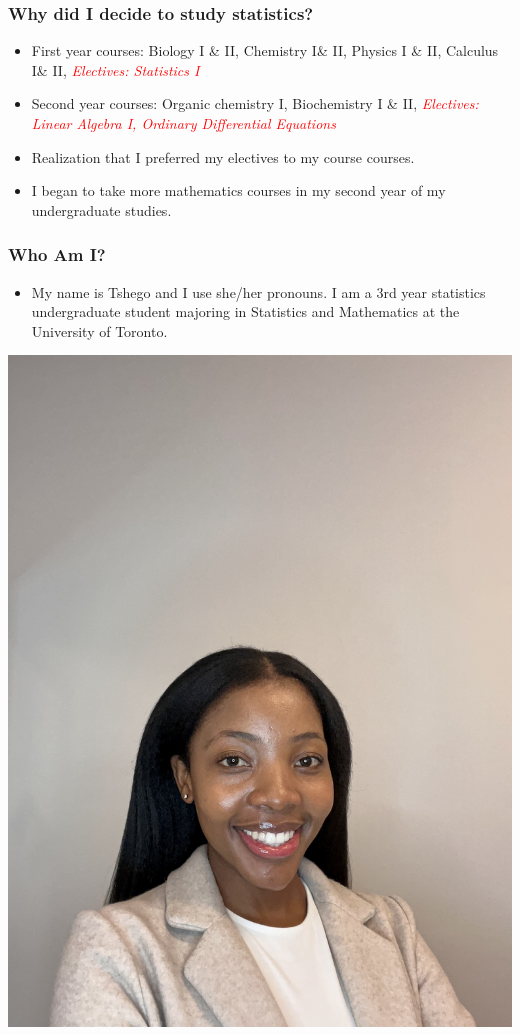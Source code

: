 \documentclass{beamer}
\begin{document}


\begin{frame}
\frametitle{\textbf{Why} did I decide to study statistics?}
\begin{itemize}
\item First year courses: Biology I \& II, Chemistry I\& II, Physics I \& II, Calculus I\& II, \textit{\textcolor{red}{Electives: Statistics I}}
\item Second year courses: Organic chemistry I, Biochemistry I \& II, \textit{\textcolor{red}{ Electives: Linear Algebra I, Ordinary Differential Equations}}
\item Realization that I preferred my electives to my course courses.  
\item I began to take more mathematics courses in my second year of my undergraduate studies. 
\end{itemize}

\end{frame}




\begin{frame}
\frametitle{\textbf{Who} Am I?}
\begin{itemize}
	\item My name is Tshego and I use she/her pronouns. I am a 3rd year statistics undergraduate student majoring in Statistics and Mathematics at the University of Toronto. \end{itemize}
	\begin{center}
	\includegraphics[width=0.4\linewidth]{Tshego-Headshot.jpeg}
	\begin{figure}[H]
	\end{figure}
\end{center}


\end{frame}
\end{document}
